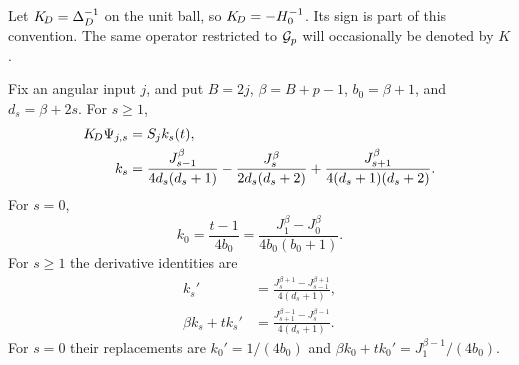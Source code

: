 Let $K_{\!D}=\Delta_D^{-1}$ on the unit ball, so $K_{\!D}=-H_0^{-1}$.
Its sign is part of this convention. The same operator restricted
to $\mathcal{G}_p$ will occasionally be denoted by $K$.

\begin{lemma}\label{inf:poisson-columns}
Fix an angular input $j$, and put $B=2j$, $\beta=B+p-1$,
$b_0=\beta+1$, and $d_s=\beta+2s$.
For $s\ge1$,
\begin{align}
 K_{\!D}\Psi_{j,s}&=S_jk_s(t),\nonumber\\
 k_s&=\frac{J_{s-1}^\beta}{4d_s(d_s+1)}
 -\frac{J_s^\beta}{2d_s(d_s+2)}
 +\frac{J_{s+1}^\beta}{4(d_s+1)(d_s+2)}.\label{inf:poisson-profile}
\end{align}
For $s=0$,
\begin{equation}\label{inf:poisson-harmonic}
 k_0=\frac{t-1}{4b_0}
     =\frac{J_1^\beta-J_0^\beta}{4b_0(b_0+1)}.
\end{equation}
For $s\ge1$ the derivative identities are
\begin{align}
 k_s'&=\frac{J_s^{\beta+1}-J_{s-1}^{\beta+1}}{4(d_s+1)},
 \label{inf:poisson-derivative}\\
 \beta k_s+tk_s'&=
 \frac{J_{s+1}^{\beta-1}-J_s^{\beta-1}}{4(d_s+1)}.
 \label{inf:poisson-lowered}
\end{align}
For $s=0$ their replacements are
$k_0'=1/(4b_0)$ and
$\beta k_0+tk_0'=J_1^{\beta-1}/(4b_0)$.
\end{lemma}
